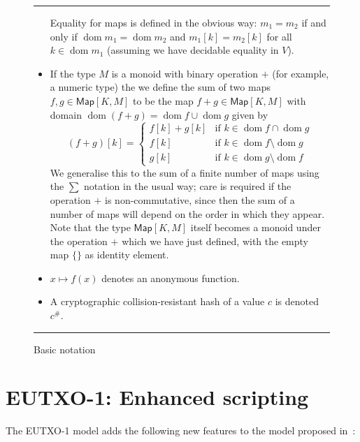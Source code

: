 \documentclass[a4paper]{article}
\newcounter{note}
\newcommand{\s}{\textsf}  %
\newcommand\rfskip{7pt}
\newenvironment{ruledfigure}[1]{\begin{figure}[#1]\hrule\vspace{\rfskip}}{\vspace{\rfskip}\hrule\end{figure}}
\newcommand{\Map}[2]{\ensuremath{\s{Map}[#1,#2]}}
\newcommand{\dom}{\ensuremath{\mathop{\mathrm{dom}}}}
\begin{document}
\begin{ruledfigure}{H}
\begin{itemize}
    Equality for maps is defined in the obvious way: $m_1 = m_2$ if
    and only if $\dom m_1 = \dom m_2$ and $m_1[k] = m_2[k]$ for all
    $k \in \dom m_1$ (assuming we have decidable equality in $V$).
    
  \item If the type $M$ is a monoid with binary operation $+$ (for
    example, a numeric type) the we define the sum of two maps
    $f, g \in \Map{K}{M}$ to be the map $f+g \in \Map{K}{M}$ with
    domain $\dom (f+g) = \dom f \cup \dom g$ given by
    \[
    (f+g)[k] =
    \left\{ \begin{array}{ll}
        f[k] + g[k] & \mbox{if $k \in \dom f \cap \dom g$}\\
        f[k] & \mbox{if $k \in \dom f \setminus \dom g$}\\
        g[k] & \mbox{if $k \in \dom g \setminus \dom f$}
      \end{array}
      \right.
      \]
      We generalise this to the sum of a finite number of maps using
      the $\sum$ notation in the usual way; care is required if the
      operation $+$ is non-commutative, since then the sum of a number of
      maps will depend on the order in which they appear. Note that
      the type $\Map{K}{M}$ itself becomes a monoid under the
      operation $+$ which we have just defined, with the empty map $\{\}$ as
      identity element.

    \item $x \mapsto f(x)$ denotes an anonymous function.

  \item A cryptographic
    collision-resistant hash of a value $c$ is denoted $c^{\#}$.

\end{itemize}
\caption{Basic notation}
\label{fig:basic-notation}
\end{ruledfigure}





\section{EUTXO-1: Enhanced scripting}
\label{sec:eutxo-1}
The EUTXO-1 model adds the following new features to the model 
proposed in~\citep{Zahnentferner18-UTxO}:
\end{document}
